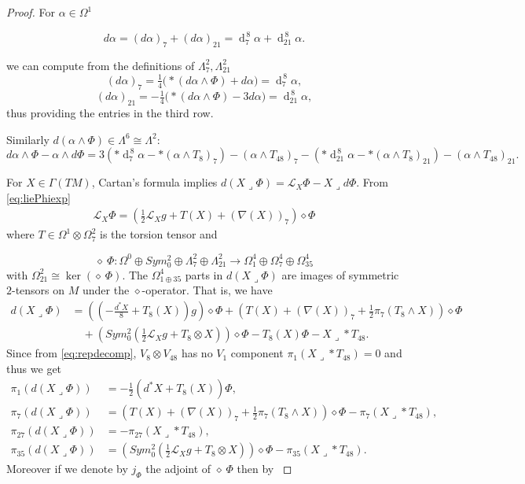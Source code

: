 \documentclass[10pt,a4paper,reqno]{article}
\theoremstyle{definition}
\numberwithin{equation}{section}
\DeclareMathOperator{\dd}{d}
\begin{document}
\begin{proof}
For $\alpha \in \Omega^1$


\[
d\alpha = (d\alpha)_7 + (d\alpha)_{21}
         = \dd_7^{\,8}\alpha + \dd_{21}^{\,8}\alpha .
\]

we can compute from the definitions of $\Lambda^2_7,\Lambda^2_{21}$ 
\[
(d\alpha)_7   = \tfrac14\big(*(d\alpha\wedge\Phi) + d\alpha\big) = \dd_7^{\,8}\alpha,
\]
\[
(d\alpha)_{21} = -\tfrac14\big(*(d\alpha\wedge\Phi) - 3 d\alpha\big) = \dd_{21}^{\,8}\alpha,
\]thus providing the entries in the third row.

Similarly
$d(\alpha\wedge\Phi)\in\Lambda^6\cong\Lambda^2$:
\[
d\alpha\wedge\Phi-\alpha\wedge d\Phi = 3(*\dd_7^{\,8}\alpha - *(\alpha\wedge T_8)_7)-(\alpha\wedge T_{48})_7-( *\dd_{21}^{\,8}\alpha - *(\alpha\wedge T_8)_{21}) -(\alpha\wedge T_{48})_{21}.
\]

For $X\in\Gamma(TM)$, Cartan's formula implies $d(X\lrcorner \Phi) = \mathcal{L}_X\Phi-X\lrcorner d\Phi$. 
From \cref{eq:liePhiexp}
\begin{align*}
    \mathcal{L}_X\Phi = \left(\frac{1}{2}\mathcal{L}_Xg + T(X)+(\nabla(X))_7\right) \diamond \Phi
\end{align*} where $T\in\Omega^1\otimes\Omega^2_7$ is the torsion tensor and 

\[\diamond \ \Phi \colon \Omega^0\oplus Sym^2_0\oplus \Lambda^2_7\oplus \Lambda^2_{21} \to  \Omega^4_1\oplus\Omega^4_7\oplus \Omega^4_{35}
    \] with $\Omega^2_{21}\cong \ker(\diamond \ \Phi)$. 
The $\Omega^4_{1\oplus 35}$ parts in $d(X\lrcorner \Phi)$ are images of symmetric $2$-tensors on $M$ under the $\diamond$-operator. That is, we have
\begin{align*}
    d(X\lrcorner\Phi)& = \left( \left( -\frac{d^*X}{8} + T_8(X)\right) g \right) \diamond \Phi + (T(X)+(\nabla(X))_7+\frac{1}{2}\pi_7(T_8\wedge X))\diamond \Phi \\
    & \quad + \left(Sym^2_0 (\frac{1}{2}\mathcal{L}_Xg + T_8\otimes X)\right)\diamond \Phi -T_8(X)\Phi - X\lrcorner *T_{48}.
\end{align*}
Since from \cref{eq:repdecomp}, $V_8\otimes V_{48}$ has no $V_1$ component $\pi_1(X\lrcorner *T_{48})=0$ and thus we get
\begin{align*}
    \pi_1(d(X\lrcorner \Phi))&= -\frac{1}{2} (d^*X+T_8(X)) \Phi,\\
    \pi_7(d(X\lrcorner \Phi))&= (T(X)+(\nabla(X))_7+\frac{1}{2}\pi_7(T_8\wedge X))\diamond \Phi - \pi_7(X\lrcorner *T_{48}),\\
    \pi_{27}(d(X\lrcorner \Phi))&= - \pi_{27}(X\lrcorner *T_{48}),\\
\pi_{35}(d(X\lrcorner \Phi))&=  \left(Sym^2_0 (\frac{1}{2}\mathcal{L}_Xg + T_8\otimes X)\right)\diamond \Phi - \pi_{35}(X\lrcorner *T_{48}). 
\end{align*} Moreover if we denote by $j_\Phi$ the adjoint of $\diamond\ \Phi$ then by \cite[Proposition 2.4]{Spin7-flow_Dwivedi}


\end{proof}
\end{document}
